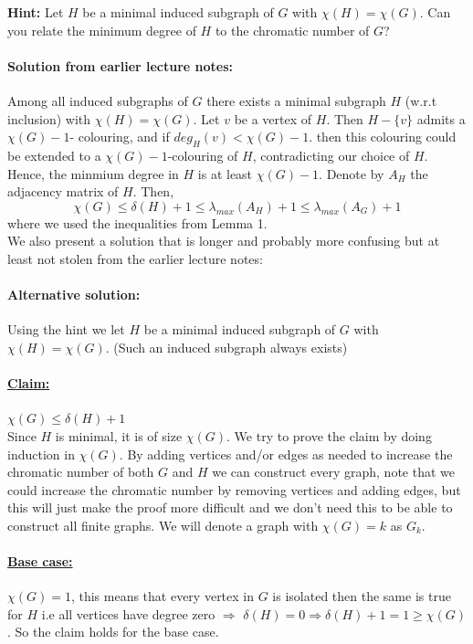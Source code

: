 \documentclass{article}
\begin{document}
  \textbf{Hint:} Let $H$ be a minimal induced subgraph of $G$ with $\chi(H) = \chi(G)$. Can you relate the minimum degree of $H$ to the chromatic number of $G$?
  
\paragraph{Solution from earlier lecture notes:} Among all induced subgraphs of $G$ there exists a minimal subgraph $H$ (w.r.t inclusion) with $\chi(H)= \chi(G)$. Let $v$ be a vertex of $H$. Then $H - \{v\}$ admits a $\chi(G) - 1$- colouring, and if $deg_{H}(v) < \chi(G) - 1$. then this colouring could be extended to a $\chi(G) - 1$-colouring of $H$, contradicting our choice of $H$. Hence, the minmium degree in $H$ is at least $\chi(G) - 1$. Denote by $A_{H}$ the adjacency matrix of $H$. Then, 
$$\chi(G) \leq \delta(H) + 1 \leq \lambda_{max}(A_{H}) + 1\leq \lambda_{max}(A_{G}) + 1$$ where we used the inequalities from Lemma 1.\\

We also present a solution that is longer and probably more confusing but at least not stolen from the earlier lecture notes:

\paragraph{Alternative solution:} Using the hint we let $H$ be a minimal induced subgraph of $G$ with $\chi(H) = \chi(G)$. (Such an induced subgraph always exists) 
\paragraph{\underline{Claim:}} $\chi(G) \leq \delta(H) + 1 $ \\
Since $H$ is minimal, it is of size $\chi(G)$. We try to prove the claim by doing induction in $\chi(G)$. By adding vertices and/or edges as needed to increase the chromatic number of both $G$ and $H$ we can construct every graph, note that we could increase the chromatic number by removing vertices and adding edges, but this will just make the proof more difficult and we don't need this to be able to construct all finite graphs. We will denote a graph with $\chi(G) = k$ as $G_{k}$. 

\paragraph{\underline{Base case:}} $\chi(G) = 1$, this means that every vertex in $G$ is isolated then the same is true for $H$  i.e all vertices have degree zero $\Rightarrow$ $\delta(H) = 0 \Rightarrow \delta(H) + 1 = 1 \geq \chi(G)$. So the claim holds for the base case.
\end{document}
